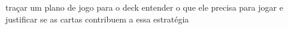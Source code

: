 traçar um plano de jogo para o deck entender o que ele precisa para jogar e justificar se as cartas contribuem a essa estratégia